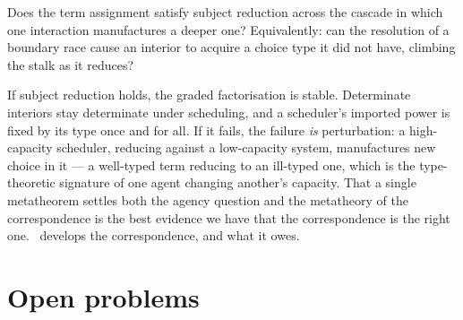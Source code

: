 \begin{question}\label{ndo:q:sr}
Does the term assignment satisfy subject reduction across the cascade in which one
interaction manufactures a deeper one? Equivalently: can the resolution of a boundary
race cause an interior to acquire a choice type it did not have, climbing the stalk as
it reduces?
\end{question}

\noindent
If subject reduction holds, the graded factorisation is stable. Determinate interiors
stay determinate under scheduling, and a scheduler's imported power is fixed by its
type once and for all. If it fails, the failure \emph{is} perturbation: a high-capacity
scheduler, reducing against a low-capacity system, manufactures new choice in it --- a
well-typed term reducing to an ill-typed one, which is the type-theoretic signature of
one agent changing another's capacity. That a single metatheorem settles both the
agency question and the metatheory of the correspondence is the best evidence we have
that the correspondence is the right one. \chChs\ develops the correspondence, and
what it owes.

\section{Open problems}\label{ndo:sec:open}


